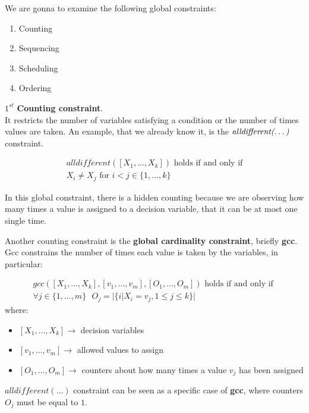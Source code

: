 We are gonna to examine the following global constraints:
\begin{enumerate}
    \item Counting
    \item Sequencing 
    \item Scheduling
    \item Ordering
\end{enumerate}
$1^{st}$ \textbf{Counting constraint}. \\
It restricts the number of variables satisfying a condition or the number of times values are taken. An example, that we already know it, is the $\textit{alldifferent(\dots)}$ constraint.
\begin{definition}[title = $\textit{alldifferent(\dots)}$]
    $$
        \begin{gathered}
            \textit{alldifferent}([X_1, \dots, X_k]) \text{ holds if and only if} \\
            X_i \neq X_j \text{ for } i < j \in \{1, \dots, k\}
        \end{gathered}
    $$
\end{definition} 
In this global constraint, there is a hidden counting because we are observing how many times a value is assigned to a decision variable, that it can be at most 
one single time. \vspace{7pt}

Another counting constraint is the \textbf{global cardinality constraint}, briefly \textbf{gcc}. Gcc constrains the number of times each value is taken 
by the variables, in particular:
\begin{definition}[title = $\textit{gcc}(\dots)$]
    $$
        \begin{gathered}
            \textit{gcc}([X_1, \dots, X_k], [v_1, \dots, v_m], [O_1, \dots, O_m]) \text{ holds if and only if } \\
            \forall j \in \{1, \dots, m\} \text{ } O_j = |\{i | X_i = v_j, 1 \leq j \leq k\}|
        \end{gathered}
    $$
    where:
    \begin{itemize}
        \renewcommand{\labelitemi}{-}
        \item $[X_1, \dots, X_k] \rightarrow$ decision variables
        \item $[v_1, \dots, v_m] \rightarrow$ allowed values to assign
        \item $[O_1, \dots, O_m] \rightarrow$ counters about how many times a value $v_j$ has been assigned
    \end{itemize}
\end{definition}
$\textit{alldifferent}(\dots)$ constraint can be seen as a specific case of \textbf{gcc}, where counters $O_j$ must be equal to $1$. \vspace{7pt}

